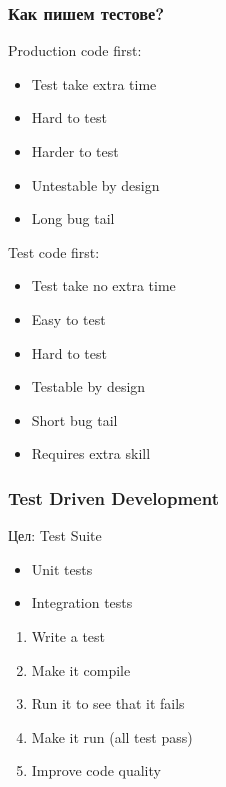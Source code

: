 
\begin{frame}
  \frametitle{Как пишем тестове?}
  \begin{minipage}[t]{0.48\linewidth}
  \pause
  Production code first:\pause
  \begin{itemize}
     \item Test take extra time\pause
     \item Hard to test\pause
     \item Harder to test\pause
     \item Untestable by design\pause
     \item Long bug tail\pause
  \end{itemize}
  \end{minipage}\hfill
  \begin{minipage}[t]{0.48\linewidth}
  Test code first:\pause
  \begin{itemize}
     \item Test take no extra time\pause
     \item Easy to test\pause
     \item Hard to test\pause
     \item Testable by design\pause
     \item Short bug tail\pause
     \item Requires extra skill
  \end{itemize}
  \end{minipage}
\end{frame}

\begin{frame}
  \frametitle{Test Driven Development}
    \begin{minipage}[t]{0.48\linewidth}
        \pause
        Цел: Test Suite\pause
        \begin{itemize}
            \item Unit tests\pause
            \item Integration tests\pause
        \end{itemize}
    \end{minipage}\hfill
    \begin{minipage}[t]{0.48\linewidth}
        \begin{enumerate} 
            \item Write a test
            \item Make it compile
            \item Run it to see that it fails
            \item Make it run (all test pass)
            \item Improve code quality
         \end{enumerate} 
    \end{minipage}
\end{frame}


